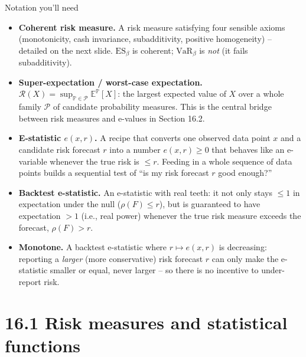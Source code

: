 \documentclass[aspectratio=169,10pt]{beamer}
\newcommand{\PP}{\mathbb{P}}
\newcommand{\EE}{\mathbb{E}}
\newcommand{\1}{\mathbb{1}}
\begin{document}
\begin{frame}[allowframebreaks]{Notation you'll need}
\begin{itemize}
\item \textbf{Coherent risk measure.} A risk measure satisfying four sensible axioms (monotonicity, cash invariance, subadditivity, positive homogeneity) -- detailed on the next slide. $\mathrm{ES}_\beta$ is coherent; $\mathrm{VaR}_\beta$ is \emph{not} (it fails subadditivity).

\framebreak

\item \textbf{Super-expectation / worst-case expectation.} $\mathcal R(X) = \sup_{\PP \in \mathcal P} \EE^{\PP}[X]$: the largest expected value of $X$ over a whole family $\mathcal P$ of candidate probability measures. This is the central bridge between risk measures and e-values in Section 16.2.

\item \textbf{E-statistic $e(x,r)$.} A recipe that converts one observed data point $x$ and a candidate risk forecast $r$ into a number $e(x,r) \ge 0$ that behaves like an e-variable whenever the true risk is $\le r$. Feeding in a whole sequence of data points builds a sequential test of ``is my risk forecast $r$ good enough?''

\item \textbf{Backtest e-statistic.} An e-statistic with real teeth: it not only stays $\le 1$ in expectation under the null ($\rho(F)\le r$), but is guaranteed to have expectation $>1$ (i.e., real power) whenever the true risk measure exceeds the forecast, $\rho(F) > r$.

\item \textbf{Monotone.} A backtest e-statistic where $r \mapsto e(x,r)$ is decreasing: reporting a \emph{larger} (more conservative) risk forecast $r$ can only make the e-statistic smaller or equal, never larger -- so there is no incentive to under-report risk.
\end{itemize}

\end{frame}

\section{16.1 Risk measures and statistical functions}
\end{document}

